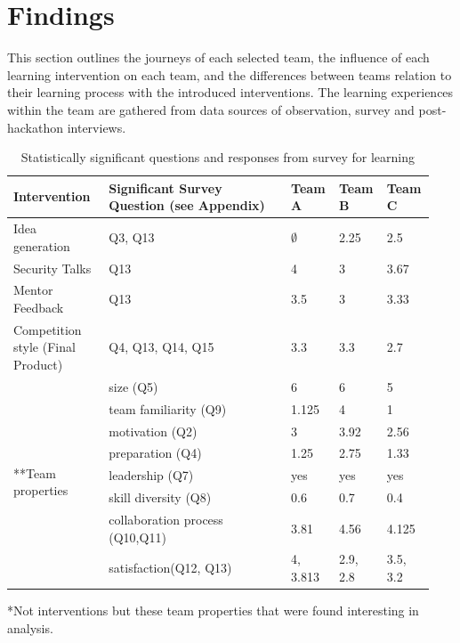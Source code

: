 \documentclass[runningheads]{llncs}
\begin{document}
\section{Findings}
This section outlines the journeys of each selected team, the influence of each learning intervention on each team, and the differences between teams relation to their learning process with the introduced interventions.
The learning experiences within the team are gathered from data sources of observation, survey and  post-hackathon interviews. 
\begin{table}[h]
    \caption{ Statistically significant questions and responses from survey for learning}
    \label{tab:teambinter}
    \begin{tabular}{|p{0.22\linewidth}|p{0.42\linewidth}|p{0.1\linewidth}|p{0.1\linewidth}|p{0.1\linewidth}|}\hline
	Intervention & Significant \newline Survey Question (see Appendix) &  Team A & Team B & Team C \\ \hline
	Idea generation & Q3, Q13 & $\emptyset$ & 2.25 & 2.5  \\ \hline
	Security Talks  & Q13 &  4 & 3 & 3.67   \\ \hline
	Mentor Feedback  & Q13 &  3.5 & 3 & 3.33 \\ \hline
	Competition style \newline (Final Product) & Q4, Q13, Q14, Q15 & 3.3 & 3.3 & 2.7   \\ \hline
	\multirow{8}{*}{**Team properties} & size (Q5) & 6 & 6 & 5  \\\cline{2-5}
	& team familiarity (Q9) & 1.125 & 4 & 1  \\ \cline{2-5}
	& motivation (Q2) & 3 & 3.92 & 2.56  \\ \cline{2-5}
	& preparation (Q4) & 1.25 & 2.75 & 1.33  \\ \cline{2-5}
	& leadership (Q7) & yes & yes & yes  \\ \cline{2-5}
	& skill diversity (Q8) & 0.6 & 0.7 & 0.4  \\ \cline{2-5}
	& collaboration process (Q10,Q11) & 3.81 & 4.56 & 4.125  \\ \cline{2-5}
	& satisfaction(Q12, Q13) & 4, 3.813 & 2.9, 2.8 & 3.5, 3.2  \\ \hline
    \end{tabular}
    *Not interventions but these team properties that were found interesting in analysis.
\end{table}
\end{document}
